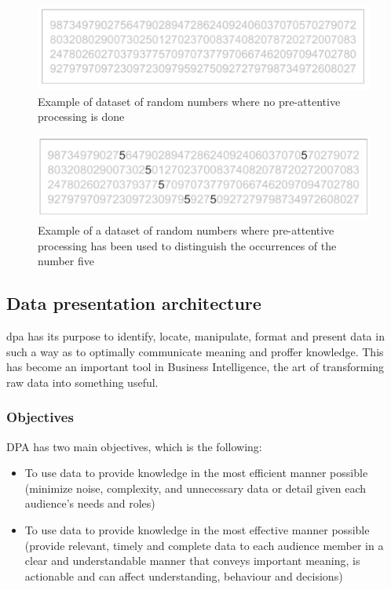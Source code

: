 \begin{figure}[h!]
\includegraphics[scale=0.3]{attentive}
\caption{Example of dataset of random numbers where no pre-attentive processing is done}
\end{figure}

\begin{figure}[h!]
\includegraphics[scale=0.3]{pre_attentive}
\caption{Example of a dataset of random numbers where pre-attentive processing has been used to distinguish the occurrences of the number five}
\end{figure}
\subsection{Data presentation architecture}
\gls{dpa} has its purpose to identify, locate, manipulate, format and present data in such a way as to optimally communicate meaning and proffer knowledge\cite{wiki_data_viz}. This has become an important tool in Business Intelligence, the art of transforming raw data into something useful. 

\subsubsection{Objectives}
DPA has two main objectives, which is the following:

\begin{itemize}
\item To use data to provide knowledge in the most efficient manner possible (minimize noise, complexity, and unnecessary data or detail given each audience's needs and roles)
\item To use data to provide knowledge in the most effective manner possible (provide relevant, timely and complete data to each audience member in a clear and understandable manner that conveys important meaning, is actionable and can affect understanding, behaviour and decisions)
\end{itemize}

